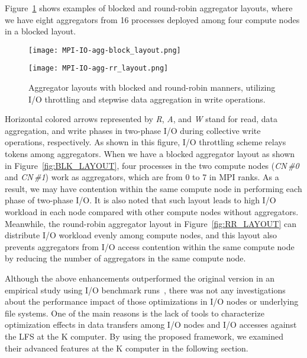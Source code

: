 \documentclass{jhps}
\begin{document}
Figure~\ref{fig:AGG_RR_LAYOUT} shows examples of blocked and round-robin
aggregator layouts, where we have eight aggregators from 16 processes
deployed among four compute nodes in a blocked layout.
%
\begin{figure}[tb]
\centering
\begin{minipage}[t]{0.36\textwidth}
\centering
\texttt{[image: MPI-IO-agg-block\_layout.png]}
\label{fig:BLK_LAYOUT}
\end{minipage}
\noindent
\begin{minipage}[t]{0.36\textwidth}
\centering
\texttt{[image: MPI-IO-agg-rr\_layout.png]}
\label{fig:RR_LAYOUT}
\end{minipage}
\caption{Aggregator layouts with blocked and round-robin manners,
utilizing I/O throttling and stepwise data aggregation in write operations.}
\label{fig:AGG_RR_LAYOUT}
\end{figure}
%
Horizontal colored arrows represented by {\itshape R}, {\itshape A},
and {\itshape W} stand for
read, data aggregation, and write phases in two-phase I/O during collective write
operations, respectively.
As shown in this figure, I/O throttling scheme relays tokens among aggregators.
When we have a blocked aggregator layout as shown in
Figure~\ref{fig:BLK_LAYOUT},
four processes in the two compute nodes ({\itshape CN\,\#0} and {\itshape CN\,\#1})
work as aggregators, which are from 0 to 7 in MPI ranks.
As a result, we may have contention within the same compute node
in performing each phase of two-phase I/O.
It is also noted that such layout leads to high I/O workload
in each node compared with other compute nodes without aggregators.
Meanwhile, the round-robin aggregator layout in
Figure~\ref{fig:RR_LAYOUT}
can distribute I/O workload evenly
among compute nodes, and this layout also prevents aggregators
from I/O access contention within the same compute node
by reducing the number of aggregators in the same compute node.

Although the above enhancements outperformed the original version
in an empirical study using I/O benchmark runs~\cite{tsujita:WS_EuroMPI2014,tsujita:hpcasia18},
there was not any investigations about the performance impact
of those optimizations in I/O nodes or underlying file systems.
One of the main reasons is the lack of tools to characterize optimization
effects in data transfers among I/O nodes and I/O accesses
against the LFS at the K computer.
By using the proposed framework, we examined their advanced features
at the K computer in the following section.
\end{document}
